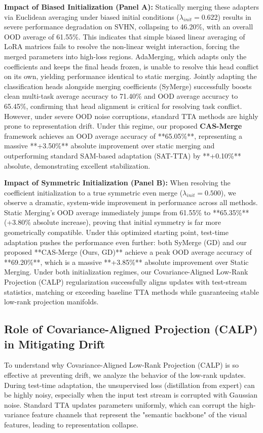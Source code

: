 \documentclass{article}
\begin{document}
\textbf{Impact of Biased Initialization (Panel A):} Statically merging these adapters via Euclidean averaging under biased initial conditions ($\lambda_{init} = 0.622$) results in severe performance degradation on SVHN, collapsing to 46.20\%, with an overall OOD average of 61.55\%. This indicates that simple biased linear averaging of LoRA matrices fails to resolve the non-linear weight interaction, forcing the merged parameters into high-loss regions. AdaMerging, which adapts only the coefficients and keeps the final heads frozen, is unable to resolve this head conflict on its own, yielding performance identical to static merging. Jointly adapting the classification heads alongside merging coefficients (SyMerge) successfully boosts clean multi-task average accuracy to 71.40\% and OOD average accuracy to 65.45\%, confirming that head alignment is critical for resolving task conflict. However, under severe OOD noise corruptions, standard TTA methods are highly prone to representation drift. Under this regime, our proposed \textbf{CAS-Merge} framework achieves an OOD average accuracy of **65.05\%**, representing a massive **+3.50\%** absolute improvement over static merging and outperforming standard SAM-based adaptation (SAT-TTA) by **+0.10\%** absolute, demonstrating excellent stabilization.

\textbf{Impact of Symmetric Initialization (Panel B):} When resolving the coefficient initialization to a true symmetric even merge ($\lambda_{init} = 0.500$), we observe a dramatic, system-wide improvement in performance across all methods. Static Merging's OOD average immediately jumps from 61.55\% to **65.35\%** (+3.80\% absolute increase), proving that initial symmetry is far more geometrically compatible. Under this optimized starting point, test-time adaptation pushes the performance even further: both SyMerge (GD) and our proposed **CAS-Merge (Ours, GD)** achieve a peak OOD average accuracy of **69.20\%**, which is a massive **+3.85\%** absolute improvement over Static Merging. Under both initialization regimes, our Covariance-Aligned Low-Rank Projection (CALP) regularization successfully aligns updates with test-stream statistics, matching or exceeding baseline TTA methods while guaranteeing stable low-rank projection manifolds.

\subsection{Role of Covariance-Aligned Projection (CALP) in Mitigating Drift}
To understand why Covariance-Aligned Low-Rank Projection (CALP) is so effective at preventing drift, we analyze the behavior of the low-rank updates. During test-time adaptation, the unsupervised loss (distillation from expert) can be highly noisy, especially when the input test stream is corrupted with Gaussian noise. Standard TTA updates parameters uniformly, which can corrupt the high-variance feature channels that represent the "semantic backbone" of the visual features, leading to representation collapse.
\end{document}
